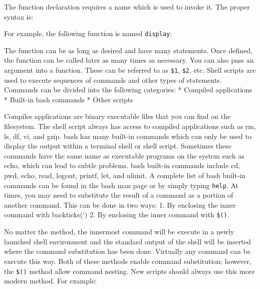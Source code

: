 The function declaration requires a name which is used to invoke it. The
proper syntax is:

\begin{Shaded}
\begin{Highlighting}[]
 \KeywordTok{\{}
\KeywordTok{\}}
\end{Highlighting}
\end{Shaded}

For example, the following function is named \texttt{display}:

\begin{Shaded}
\begin{Highlighting}[]
 \KeywordTok{\{}
   
\KeywordTok{\}}
\end{Highlighting}
\end{Shaded}

The function can be as long as desired and have many statements. Once
defined, the function can be called later as many times as necessary.
You can also pass an argument into a function. These can be referred to
as \texttt{\$1}, \texttt{\$2}, etc. Shell scripts are used to execute
sequences of commands and other types of statements. Commands can be
divided into the following categories: * Compiled applications *
Built-in bash commands * Other scripts

Compiles applications are binary executable files that you can find on
the filesystem. The shell script always has access to compiled
applications such as rm, ls, df, vi, and gzip. bash has many built-in
commands which can only be used to display the output within a terminal
shell or shell script. Sometimes these commands have the same name as
executable programs on the system such as echo, which can lead to subtle
problems. bash built-in commands include cd, pwd, echo, read, logout,
printf, let, and ulimit. A complete list of bash built-in commands can
be found in the bash man page or by simply typing \texttt{help}. At
times, you may need to substitute the result of a command as a portion
of another command. This can be done in two ways: 1. By enclosing the
inner command with backticks(`) 2. By enclosing the inner command with
\texttt{\$()}.

No matter the method, the innermost command will be execute in a newly
launched shell environment and the standard output of the shell will be
inserted where the command substitution has been done. Virtually any
command can be execute this way. Both of these methods enable command
substitution; however, the \texttt{\$()} method allow command nesting.
New scripts should always use this more modern method. For example:

